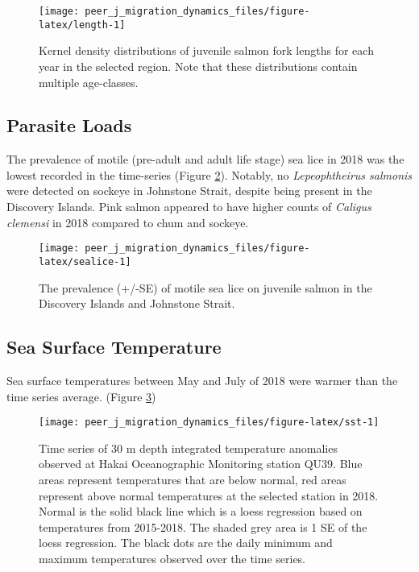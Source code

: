 \documentclass[fleqn,10pt]{wlpeerj} %
\begin{document}
\begin{figure}[H]
\texttt{[image: peer\_j\_migration\_dynamics\_files/figure-latex/length-1]} \caption{Kernel density distributions of juvenile salmon fork lengths for each year in the selected region. Note that these distributions contain multiple age-classes.}\label{fig:length}
\end{figure}

\subsection*{Parasite Loads}\label{parasite-loads}

The prevalence of motile (pre-adult and adult life stage) sea lice in
2018 was the lowest recorded in the time-series (Figure
\ref{fig:sealice}). Notably, no \emph{Lepeophtheirus salmonis} were
detected on sockeye in Johnstone Strait, despite being present in the
Discovery Islands. Pink salmon appeared to have higher counts of
\emph{Caligus clemensi} in 2018 compared to chum and sockeye.

\begin{figure}[H]
\texttt{[image: peer\_j\_migration\_dynamics\_files/figure-latex/sealice-1]} \caption{The prevalence (+/-SE) of motile sea lice on juvenile salmon in the Discovery Islands and Johnstone Strait.}\label{fig:sealice}
\end{figure}

\subsection*{Sea Surface Temperature}\label{sea-surface-temperature}

Sea surface temperatures between May and July of 2018 were warmer than
the time series average. (Figure \ref{fig:sst})

\begin{figure}[H]
\texttt{[image: peer\_j\_migration\_dynamics\_files/figure-latex/sst-1]} \caption{Time series of 30 m depth integrated temperature anomalies observed at Hakai Oceanographic Monitoring station QU39. Blue areas represent temperatures that are below normal, red areas represent above normal temperatures at the selected station in 2018. Normal is the solid black line which is a loess regression based on temperatures from 2015-2018. The shaded grey area is 1 SE of the loess regression. The black dots are the daily minimum and maximum temperatures observed over the time series.}\label{fig:sst}
\end{figure}
\end{document}
